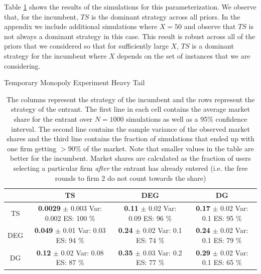 \documentclass{article}
\theoremstyle{definition}
\begin{document}
Table \ref{ht_incum} shows the results of the simulations for this parameterization. We observe that, for the incumbent, $TS$ is the dominant strategy across all priors. In the appendix we include additional simulations where $X = 50$ and observe that $TS$ is not always a dominant strategy in this case. This result is robust across all of the priors that we considered so that for sufficiently large $X$, $TS$ is a dominant strategy for the incumbent where $X$ depends on the set of instances that we are considering.

\begin{table}[ht]
\centering
\caption{Temporary Monopoly Experiment Heavy Tail} 
\begin{tabular}{c@{\hspace{1.0\tabcolsep}}ccc}
  \hline
 & TS & DEG &  DG \\ 
  \hline
TS & \makecell{\textbf{ 0.0029 } $\pm$ 0.003 \\Var: 0.002 \\ ES: 100 \%} & \makecell{\textbf{ 0.11 } $\pm$ 0.02 \\Var: 0.09 \\ ES: 96 \%} & \makecell{\textbf{ 0.17 } $\pm$ 0.02 \\Var: 0.1 \\ ES: 95 \%} \\ 
  DEG & \makecell{\textbf{ 0.049 } $\pm$ 0.01 \\Var: 0.03 \\ ES: 94 \%} & \makecell{\textbf{ 0.24 } $\pm$ 0.02 \\Var: 0.1 \\ ES: 74 \%} & \makecell{\textbf{ 0.24 } $\pm$ 0.02 \\Var: 0.1 \\ ES: 79 \%} \\ 
   DG & \makecell{\textbf{ 0.12 } $\pm$ 0.02 \\Var: 0.08 \\ ES: 87 \%} & \makecell{\textbf{ 0.35 } $\pm$ 0.03 \\Var: 0.2 \\ ES: 77 \%} & \makecell{\textbf{ 0.29 } $\pm$ 0.02 \\Var: 0.1 \\ ES: 65 \%} \\ 
   \hline
\end{tabular}
\caption*{\tiny{The columns represent the strategy of the incumbent and the rows represent the strategy of the entrant. The first line in each cell contains the average market share for the entrant over $N=1000$ simulations as well as a 95\% confidence interval. The second line contains the sample variance of the observed market shares and the third line contains the fraction of simulations that ended up with one firm getting $> 90\%$ of the market. Note that smaller values in the table are better for the incumbent. Market shares are calculated as the fraction of users selecting a particular firm \textit{after} the entrant has already entered (i.e. the free rounds to firm 2 do not count towards the share)}}
\label{ht_incum}
\end{table}
\end{document}
